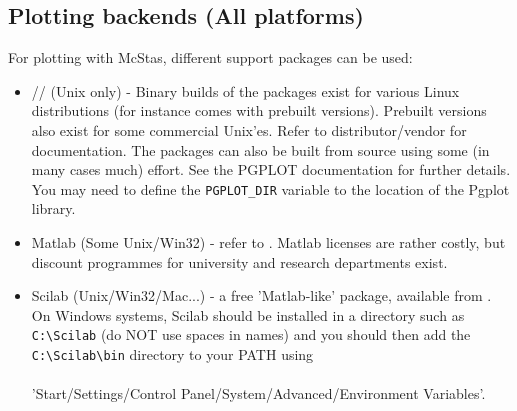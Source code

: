 \subsection{Plotting backends (All platforms)}
\label{s:plotting}
For plotting with McStas, different support packages can be used:
\begin{itemize}
\item{// (Unix only) - Binary builds of the packages
    exist for various Linux distributions (for instance
     comes with
    prebuilt versions). Prebuilt versions also exist for some commercial Unix'es.
    Refer to distributor/vendor for documentation. The packages can also be
    built from source using some (in many cases much) effort.  See the
    PGPLOT documentation for further details.
    You may need to define the \verb+PGPLOT_DIR+ variable to the location of the Pgplot library. }
\item{Matlab (Some Unix/Win32) - refer to
    . Matlab licenses are rather costly, but discount programmes for university and research departments exist.}
\item{Scilab (Unix/Win32/Mac...) - a free 'Matlab-like' package, available from
    .
    \\
On Windows systems, Scilab should be installed in a directory such as \verb+C:\Scilab+ (do NOT use spaces in names) and you should then add the \verb+C:\Scilab\bin+ directory to your PATH using\\\ \\
'Start/Settings/Control Panel/System/Advanced/Environment Variables'.}
\end{itemize}

